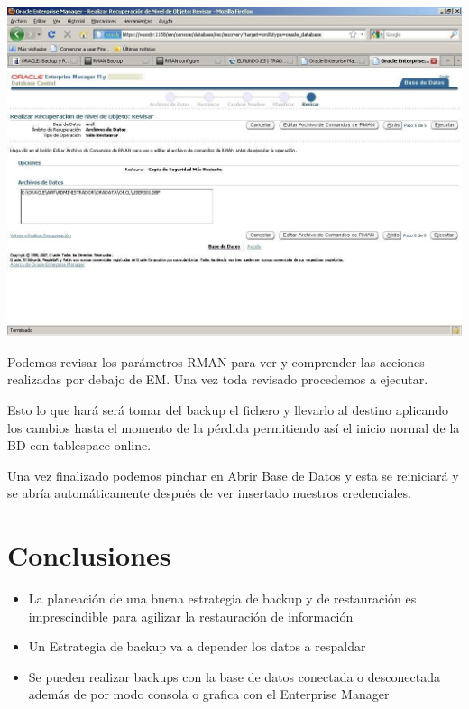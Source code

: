 \documentclass[a4paper,openright,12pt]{book}
\begin{document}
\begin{center}
\includegraphics[width=15cm]{./images/backup/13.jpg}
\end{center}
Podemos revisar los parámetros RMAN para ver y comprender las acciones realizadas por debajo de EM. Una vez toda revisado procedemos a ejecutar.

Esto lo que hará será tomar del backup el fichero y llevarlo al destino aplicando los cambios  hasta  el  momento  de  la  pérdida  permitiendo  así  el  inicio  normal  de  la  BD  con tablespace online.

Una vez finalizado podemos pinchar en Abrir Base de Datos y esta se reiniciará y se abría automáticamente después de ver insertado nuestros credenciales.

\section{Conclusiones}\label{se:EPIS}
\begin{itemize}
\item La planeación de una buena estrategia de backup y de restauración es imprescindible para agilizar la restauración de información
\item Un Estrategia de backup va a depender los datos a respaldar

\item Se pueden realizar backups con la base de datos conectada o desconectada además de por modo consola o grafica con el Enterprise Manager

\end{itemize}
\end{document}
